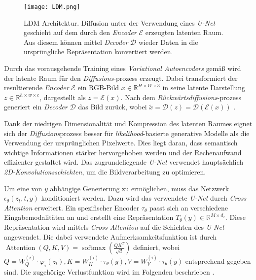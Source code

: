 \documentclass[
  a4paper,  %
  twoside,  %
  bibliography=totoc,
  headsepline,
  cleardoublepage=empty,
  parskip=half,
  draft=false
]{scrbook}
\begin{document}
\begin{figure}[h]
  \centering
  \texttt{[image: LDM.png]}
  \caption[LDM Architektur]{LDM Architektur. Diffusion unter der Verwendung eines \emph{U-Net} geschieht auf dem durch den \emph{Encoder} $\mathcal{E}$ erzeugten latenten Raum. Aus diesem können mittel \emph{Decoder} $\mathcal{D}$ wieder Daten in die ursprüngliche Repräsentation konvertiert werden.  \cite{rombach_high-resolution_2022}}
  \label{fig:LDM}
\end{figure} 

Durch das vorausgehende Training eines \emph{Variational Autoencoders} \cite{kingma_auto-encoding_2022} gemäß \cite{esser_taming_2021} wird der latente Raum für den \emph{Diffusions}-prozess erzeugt. Dabei transformiert der resultierende \emph{Encoder} $\mathcal{E}$ ein RGB-Bild $x \in \mathbb{R}^{H \times W \times 3}$ in seine latente Darstellung $z \in \mathbb{R}^{h \times w \times c}$, dargestellt als $z=\mathcal{E}(x)$. Nach dem \emph{Rückwärtsdiffusions}-prozess generiert ein \emph{Decoder} $\mathcal{D}$ das Bild zurück, wobei $\tilde{x}=\mathcal{D}(z)=\mathcal{D}(\mathcal{E}(x))$ \cite{rombach_high-resolution_2022}.

Dank der niedrigen Dimensionalität und Kompression des latenten Raumes eignet sich der \emph{Diffusions}prozess besser für \emph{likelihood}-basierte generative Modelle als die Verwendung der ursprünglichen Pixelwerte. Dies liegt daran, dass semantisch wichtige Informationen stärker hervorgehoben werden und der Rechenaufwand effizienter gestaltet wird. Das zugrundeliegende \emph{U-Net} \cite{ronneberger_u-net_2015} verwendet hauptsächlich \emph{2D-Konvolutionsschichten}, um die Bildverarbeitung zu optimieren. \cite{rombach_high-resolution_2022}

Um eine von $y$ abhängige Generierung zu ermöglichen, muss das Netzwerk $\epsilon_\theta\left(z_t, t, y\right)$ konditioniert werden. Dazu wird das verwendete \emph{U-Net} durch \emph{Cross Attention} \cite{vaswani_attention_2017} erweitert. Ein spezifischer Encoder $\tau_\theta$ passt sich an verschiedene Eingabemodalitäten an und erstellt eine Repräsentation $T_\theta(y) \in \mathbb{R}^{M \times d_\tau}$. Diese Repräsentation wird mittels \emph{Cross Attention} auf die Schichten des \emph{U-Net} angewendet. Die dabei verwendete Aufmerksamkeitsfunktion ist durch $\operatorname{Attention}(Q, K, V)=\operatorname{softmax}\left(\frac{Q K^T}{\sqrt{d}}\right)$ definiert, wobei  $Q=W_Q^{(i)} \cdot \varphi_i\left(z_t\right), K=W_K^{(i)} \cdot \tau_\theta(y), V=W_V^{(i)} \cdot \tau_\theta(y)$ entsprechend gegeben sind. Die zugehörige Verlustfunktion wird im Folgenden beschrieben \cite{rombach_high-resolution_2022}.
\end{document}
